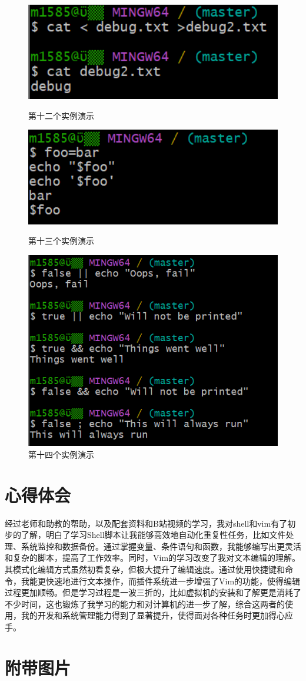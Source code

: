 \documentclass[a4paper, 12pt]{article}
\begin{document}
	\begin{figure}[h!]
		\includegraphics[width=1\textwidth]{12}
		\caption{第十二个实例演示}
		\includegraphics[width=1\textwidth]{13}
		\caption{第十三个实例演示}
		\includegraphics[width=1\textwidth]{14}
		\caption{第十四个实例演示}
	\end{figure}
    \section{心得体会}
    经过老师和助教的帮助，以及配套资料和B站视频的学习，我对shell和vim有了初步的了解，明白了学习Shell脚本让我能够高效地自动化重复性任务，比如文件处理、系统监控和数据备份。通过掌握变量、条件语句和函数，我能够编写出更灵活和复杂的脚本，提高了工作效率。同时，Vim的学习改变了我对文本编辑的理解。其模式化编辑方式虽然初看复杂，但极大提升了编辑速度。通过使用快捷键和命令，我能更快速地进行文本操作，而插件系统进一步增强了Vim的功能，使得编辑过程更加顺畅。但是学习过程是一波三折的，比如虚拟机的安装和了解更是消耗了不少时间，这也锻炼了我学习的能力和对计算机的进一步了解，综合这两者的使用，我的开发和系统管理能力得到了显著提升，使得面对各种任务时更加得心应手。
	
	
	\section{附带图片}
\end{document}
